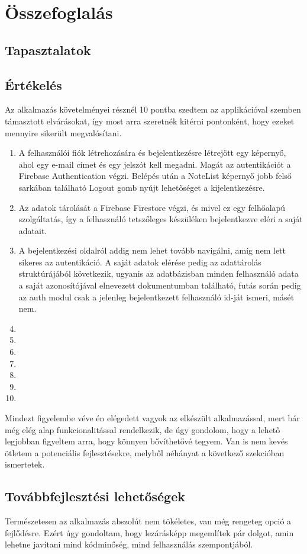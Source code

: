\chapter{Összefoglalás}


\section{Tapasztalatok}

\section{Értékelés}

Az alkalmazás követelményei résznél 10 pontba szedtem az applikációval szemben támasztott elvárásokat, így most arra szeretnék kitérni pontonként, hogy ezeket mennyire sikerült megvalósítani.

\begin{enumerate}
	\item A felhasználói fiók létrehozására és bejelentkezésre létrejött egy képernyő, ahol egy e-mail címet és egy jelszót kell megadni. Magát az autentikációt a Firebase Authentication végzi. Belépés után a NoteList képernyő jobb felső sarkában található Logout gomb nyújt lehetőséget a kijelentkezésre.
	\item Az adatok tárolását a Firebase Firestore végzi, és mivel ez egy felhőalapú szolgáltatás, így a felhasználó tetszőleges készüléken bejelentkezve eléri a saját adatait. 
	\item A bejelentkezési oldalról addig nem lehet tovább navigálni, amíg nem lett sikeres az autentikáció. A saját adatok elérése pedig az adattárolás struktúrájából következik, ugyanis az adatbázisban minden felhasználó adata a saját azonosítójával elnevezett dokumentumban található, futás során pedig az auth modul csak a jelenleg bejelentkezett felhasználó id-ját ismeri, másét nem. 
	\item 
	\item
	\item
	\item
	\item
	\item
	\item
\end{enumerate}

Mindezt figyelembe véve én elégedett vagyok az elkészült alkalmazással, mert bár még elég alap funkcionalitással rendelkezik, de úgy gondolom, hogy a lehető legjobban figyeltem arra, hogy könnyen bővíthetővé tegyem. Van is nem kevés ötletem a potenciális fejlesztésekre, melyből néhányat a következő szekcióban ismertetek. 

\section{Továbbfejlesztési lehetőségek}

Természetesen az alkalmazás abszolút nem tökéletes, van még rengeteg opció a fejlődésre. Ezért úgy gondoltam, hogy lezárásképp megemlítek pár dolgot, amin lehetne javítani mind kódminőség, mind felhasználás szempontjából.